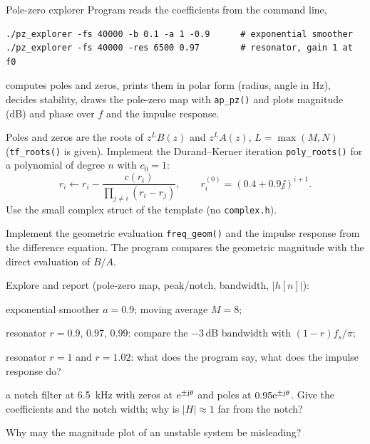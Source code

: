 \begin{exercise}{Pole-zero explorer}{\JSLinux}
Program  reads the coefficients from
the command line,
\begin{lstlisting}[style=shell]
./pz_explorer -fs 40000 -b 0.1 -a 1 -0.9      # exponential smoother
./pz_explorer -fs 40000 -res 6500 0.97        # resonator, gain 1 at f0
\end{lstlisting}
computes poles and zeros, prints them in polar form (radius, angle in Hz),
decides stability, draws the pole-zero map with \texttt{ap\_pz()} and plots
magnitude (dB) and phase over $f$ and the impulse response.
\begin{tasks}
  \item Poles and zeros are the roots of $z^LB(z)$ and $z^LA(z)$,
    $L=\max(M,N)$ (\texttt{tf\_roots()} is given). Implement the
    Durand--Kerner iteration \texttt{poly\_roots()} for a polynomial of
    degree $n$ with $c_0=1$:
    \[ r_i\leftarrow r_i-\frac{c(r_i)}{\prod_{j\ne i}(r_i-r_j)},\qquad
       r_i^{(0)}=(0.4+0.9\jj)^{i+1}. \]
    Use the small complex struct of the template (no \texttt{complex.h}).
  \item Implement the geometric evaluation \texttt{freq\_geom()} and the
    impulse response from the difference equation. The program compares the
    geometric magnitude with the direct evaluation of $B/A$.
  \item Explore and report (pole-zero map, peak/notch, bandwidth, $|h[n]|$):
    \begin{tasks}
      \item exponential smoother $a=0.9$; moving average $M=8$;
      \item resonator $r=0.9$, $0.97$, $0.99$: compare the $-3$\,dB bandwidth
        with $(1-r)f_s/\pi$;
      \item resonator $r=1$ and $r=1.02$: what does the program say, what does the
        impulse response do?
      \item a notch filter at \SI{6.5}{kHz} with zeros at $\mathrm{e}^{\pm\mathrm{j}\theta}$
        and poles at $0.95\mathrm{e}^{\pm\mathrm{j}\theta}$. Give the coefficients and the
        notch width; why is $|H|\approx1$ far from the notch?
    \end{tasks}
  \item Why may the magnitude plot of an unstable system be misleading?
\end{tasks}
\end{exercise}

